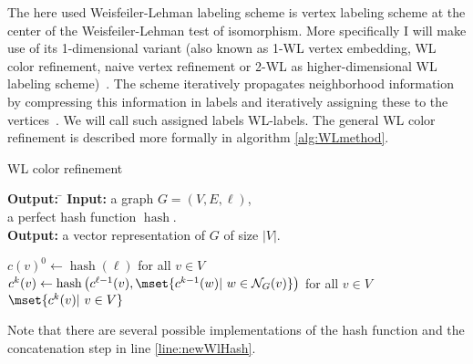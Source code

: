 The here used Weisfeiler-Lehman labeling scheme is vertex labeling scheme at the center of the Weisfeiler-Lehman test of isomorphism. 
More specifically I will make use of its 1-dimensional variant (also known as 1-WL vertex embedding, WL color refinement, naive vertex refinement or 2-WL as higher-dimensional WL labeling scheme)~\cite{2011_Shervashidze_JMLR, 2019_Xu_CONF}. 
The scheme iteratively propagates neighborhood information by compressing this information in labels and iteratively assigning these to the vertices~\cite{1968_Weisfeiler_CONF}.
We will call such assigned labels WL-labels.
The general WL color refinement is described more formally in algorithm \ref{alg:WLmethod}.
\begin{algorithm}[H]
	\caption{WL color refinement} \label{alg:WLmethod} 
	\begin{tabbing}
		\textbf{Output:} \= \kill
		\textbf{Input:} \>a graph $G=(V, E, \ell)$,\\
		\>a perfect hash function $\operatorname{hash}$.\\		
		\textbf{Output:} \>a vector representation of $G$ of size $|V|$.
	\end{tabbing}	
	\begin{algorithmic}[1]
		\State $c(v)^0 \leftarrow \operatorname{hash}(\ell)$ for all $v\in V$
			\State $c^{k}(v) \leftarrow \operatorname{hash}\big(c^{\ell-1}(v), \mset{c^{k-1}(w)| \ w\in\mathcal{N}_G(v)} \big)$ for all $v\in V$ \label{line:newWlHash}
		\EndWhile		
		\State\Return $\mset{c^{k}(v)| \ v\in V}$
	\end{algorithmic}
	Note that there are several possible implementations of the hash function and the concatenation step in line \ref{line:newWlHash}. %
\end{algorithm}

